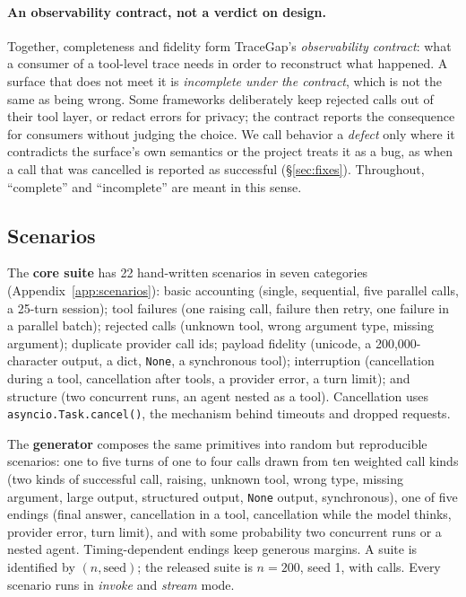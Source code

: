 \documentclass[10pt]{article}
\begin{document}
\paragraph{An observability contract, not a verdict on design.} Together, completeness and fidelity form TraceGap's \emph{observability contract}: what a consumer of a tool-level trace needs in order to reconstruct what happened. A surface that does not meet it is \emph{incomplete under the contract}, which is not the same as being wrong. Some frameworks deliberately keep rejected calls out of their tool layer, or redact errors for privacy; the contract reports the consequence for consumers without judging the choice. We call behavior a \emph{defect} only where it contradicts the surface's own semantics or the project treats it as a bug, as when a call that was cancelled is reported as successful (\S\ref{sec:fixes}). Throughout, ``complete'' and ``incomplete'' are meant in this sense.

\subsection{Scenarios}
The \textbf{core suite} has 22 hand-written scenarios in seven categories (Appendix~\ref{app:scenarios}): basic accounting (single, sequential, five parallel calls, a 25-turn session); tool failures (one raising call, failure then retry, one failure in a parallel batch); rejected calls (unknown tool, wrong argument type, missing argument); duplicate provider call ids; payload fidelity (unicode, a 200{,}000-character output, a dict, \texttt{None}, a synchronous tool); interruption (cancellation during a tool, cancellation after tools, a provider error, a turn limit); and structure (two concurrent runs, an agent nested as a tool). Cancellation uses \texttt{asyncio.Task.cancel()}, the mechanism behind timeouts and dropped requests.

The \textbf{generator} composes the same primitives into random but reproducible scenarios: one to five turns of one to four calls drawn from ten weighted call kinds (two kinds of successful call, raising, unknown tool, wrong type, missing argument, large output, structured output, \texttt{None} output, synchronous), one of five endings (final answer, cancellation in a tool, cancellation while the model thinks, provider error, turn limit), and with some probability two concurrent runs or a nested agent. Timing-dependent endings keep generous margins. A suite is identified by $(n, \text{seed})$; the released suite is $n{=}200$, seed 1, with \genCalls{} calls. Every scenario runs in \emph{invoke} and \emph{stream} mode.
\end{document}
